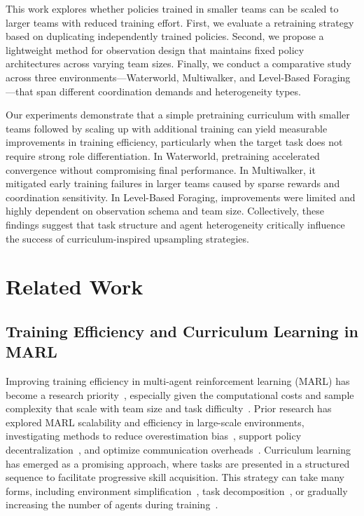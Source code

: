 \documentclass{article}
\begin{document}
This work explores whether policies trained in smaller teams can be scaled to larger teams 
with reduced training effort. First, we evaluate a retraining strategy based on duplicating 
independently trained policies. Second, we propose a lightweight method for observation 
design that maintains fixed policy architectures across varying team sizes. 
Finally, we conduct a comparative study across three environments—Waterworld, Multiwalker, 
and Level-Based Foraging—that span different coordination demands and heterogeneity types.

Our experiments demonstrate that a simple pretraining curriculum with smaller teams followed by 
scaling up with additional training can yield measurable improvements in training efficiency, 
particularly when the target task does not require strong role differentiation. 
In Waterworld, pretraining accelerated convergence without compromising final performance. 
In Multiwalker, it mitigated early training failures in larger teams caused by sparse 
rewards and coordination sensitivity. 
In Level-Based Foraging, improvements were limited and highly dependent on 
observation schema and team size. 
Collectively, these findings suggest that task structure and agent heterogeneity 
critically influence the success of curriculum-inspired upsampling strategies.

\section{Related Work}
\subsection{Training Efficiency and Curriculum Learning in MARL}

Improving training efficiency in multi-agent reinforcement learning (MARL) has become a research 
priority~\cite{canese2021,krouka2022}, especially given the computational costs and sample 
complexity that scale with team size and task difficulty~\cite{shoham2007,busoniu2008}. 
Prior research has explored MARL scalability and efficiency in large-scale environments, 
investigating methods to reduce overestimation bias~\cite{ackermann2019}, support policy 
decentralization~\cite{foerster2017,lowe2020}, and optimize communication 
overheads~\cite{sukhbaatar2016,wei2022}. Curriculum learning has emerged as a promising approach, 
where tasks are presented in a structured sequence to facilitate progressive skill acquisition. 
This strategy can take many forms, including environment simplification~\cite{shukla2022}, 
task decomposition~\cite{shi2023}, or gradually increasing the number of agents 
during training~\cite{smit2023, albrecht2024}.
\end{document}
